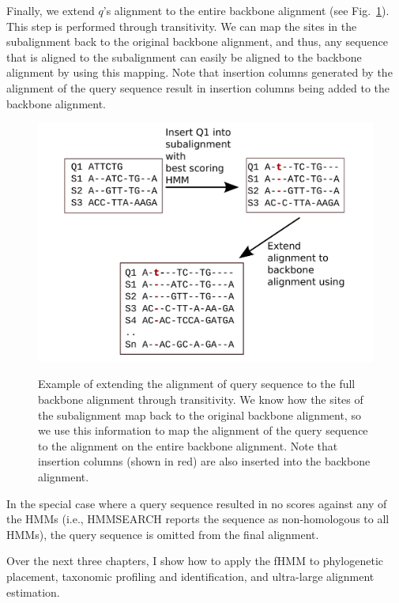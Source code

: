 Finally, we extend $q$'s alignment to the entire backbone alignment (see Fig.~\ref{hmmfamily:trans}).  This step is performed through transitivity.  We can map the sites in the subalignment back to the original backbone alignment, and thus, any sequence that is aligned to the subalignment can easily be aligned to the backbone alignment by using this mapping.  Note that insertion columns generated by the alignment of the query sequence result in insertion columns being added to the backbone alignment.

\begin{figure}[htbp]
\centering
{\includegraphics[width=1.0\textwidth]{hmmfamily/insertion}}
\caption[Example of alignment of query sequence through transitivity.]{Example of extending the alignment of query sequence to the full backbone alignment through transitivity.  We know how the sites of the subalignment map back to the original backbone alignment, so we use this information to map the alignment of the query sequence to the alignment on the entire backbone alignment.  Note that insertion columns (shown in red) are also inserted into the backbone alignment.} 
\label{hmmfamily:trans}
\end{figure}


In the special case where a query sequence resulted in no scores against any of the HMMs (i.e., HMMSEARCH reports the sequence as non-homologous to all HMMs), the query sequence is omitted from the final alignment.  

Over the next three chapters, I show how to apply the fHMM to phylogenetic placement, taxonomic profiling and identification, and ultra-large alignment estimation.



